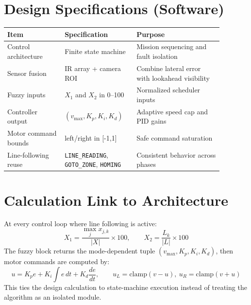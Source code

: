 \documentclass{article}
\begin{document}
\section{Design Specifications (Software)}
\begin{center}
\begin{tabular}{p{0.24\linewidth}p{0.28\linewidth}p{0.36\linewidth}}
\toprule
Item & Specification & Purpose \\
\midrule
Control architecture & Finite state machine & Mission sequencing and fault isolation \\
Sensor fusion & IR array + camera ROI & Combine lateral error with lookahead visibility \\
Fuzzy inputs & $X_1$ and $X_2$ in 0--100 & Normalized scheduler inputs \\
Controller output & $(v_{\max}, K_p, K_i, K_d)$ & Adaptive speed cap and PID gains \\
Motor command bounds & left/right in [-1,1] & Safe command saturation \\
Line-following reuse & \texttt{LINE\_READING}, \texttt{GOTO\_ZONE}, \texttt{HOMING} & Consistent behavior across phases \\
\bottomrule
\end{tabular}
\end{center}

\section{Calculation Link to Architecture}
At every control loop where line following is active:
\[
X_1 = \frac{\max_j x_{j,k}}{|X|}\times 100,\qquad
X_2 = \frac{L_k}{|L|}\times 100
\]
The fuzzy block returns the mode-dependent tuple $(v_{\max}, K_p, K_i, K_d)$, then motor commands are computed by:
\[
u = K_p e + K_i \int e\,dt + K_d \frac{de}{dt},\qquad
u_L=\text{clamp}(v-u),\ u_R=\text{clamp}(v+u)
\]
This ties the design calculation to state-machine execution instead of treating the algorithm as an isolated module.
\end{document}
